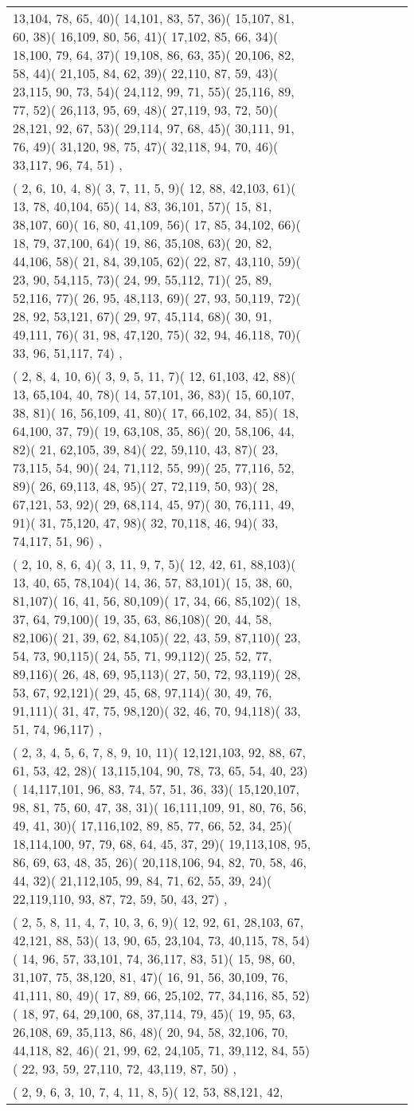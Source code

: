 \documentclass[border=10]{standalone}
\begin{document}
\begin{tabular}{@{}l@{}l@{}l@{}l@{}l@{}l@{}l@{}l@{}}
13,104, 78, 65, 40)( 14,101, 83, 57, 36)( 15,107, 81, 60, 38)( 16,109, 80, 56, 41)( 17,102, 85, 66, 34)( 18,100, 79, 64, 37)( 19,108, 86, 63, 35)( 20,106, 82, 58, 44)( 21,105, 84, 62, 39)( 22,110, 87, 59, 43)( 23,115, 90, 73, 54)( 24,112, 99, 71, 55)( 25,116, 89, 77, 52)( 26,113, 95, 69, 48)( 27,119, 93, 72, 50)( 28,121, 92, 67, 53)( 29,114, 97, 68, 45)( 30,111, 91, 76, 49)( 31,120, 98, 75, 47)( 32,118, 94, 70, 46)( 33,117, 96, 74, 51) ,\\  (  2,  6, 10,  4,  8)(  3,  7, 11,  5,  9)( 12, 88, 42,103, 61)( 13, 78, 40,104, 65)( 14, 83, 36,101, 57)( 15, 81, 38,107, 60)( 16, 80, 41,109, 56)( 17, 85, 34,102, 66)( 18, 79, 37,100, 64)( 19, 86, 35,108, 63)( 20, 82, 44,106, 58)( 21, 84, 39,105, 62)( 22, 87, 43,110, 59)( 23, 90, 54,115, 73)( 24, 99, 55,112, 71)( 25, 89, 52,116, 77)( 26, 95, 48,113, 69)( 27, 93, 50,119, 72)( 28, 92, 53,121, 67)( 29, 97, 45,114, 68)( 30, 91, 49,111, 76)( 31, 98, 47,120, 75)( 32, 94, 46,118, 70)( 33, 96, 51,117, 74) ,\\  (  2,  8,  4, 10,  6)(  3,  9,  5, 11,  7)( 12, 61,103, 42, 88)( 13, 65,104, 40, 78)( 14, 57,101, 36, 83)( 15, 60,107, 38, 81)( 16, 56,109, 41, 80)( 17, 66,102, 34, 85)( 18, 64,100, 37, 79)( 19, 63,108, 35, 86)( 20, 58,106, 44, 82)( 21, 62,105, 39, 84)( 22, 59,110, 43, 87)( 23, 73,115, 54, 90)( 24, 71,112, 55, 99)( 25, 77,116, 52, 89)( 26, 69,113, 48, 95)( 27, 72,119, 50, 93)( 28, 67,121, 53, 92)( 29, 68,114, 45, 97)( 30, 76,111, 49, 91)( 31, 75,120, 47, 98)( 32, 70,118, 46, 94)( 33, 74,117, 51, 96) ,\\  (  2, 10,  8,  6,  4)(  3, 11,  9,  7,  5)( 12, 42, 61, 88,103)( 13, 40, 65, 78,104)( 14, 36, 57, 83,101)( 15, 38, 60, 81,107)( 16, 41, 56, 80,109)( 17, 34, 66, 85,102)( 18, 37, 64, 79,100)( 19, 35, 63, 86,108)( 20, 44, 58, 82,106)( 21, 39, 62, 84,105)( 22, 43, 59, 87,110)( 23, 54, 73, 90,115)( 24, 55, 71, 99,112)( 25, 52, 77, 89,116)( 26, 48, 69, 95,113)( 27, 50, 72, 93,119)( 28, 53, 67, 92,121)( 29, 45, 68, 97,114)( 30, 49, 76, 91,111)( 31, 47, 75, 98,120)( 32, 46, 70, 94,118)( 33, 51, 74, 96,117) ,\\  (  2,  3,  4,  5,  6,  7,  8,  9, 10, 11)( 12,121,103, 92, 88, 67, 61, 53, 42, 28)( 13,115,104, 90, 78, 73, 65, 54, 40, 23)( 14,117,101, 96, 83, 74, 57, 51, 36, 33)( 15,120,107, 98, 81, 75, 60, 47, 38, 31)( 16,111,109, 91, 80, 76, 56, 49, 41, 30)( 17,116,102, 89, 85, 77, 66, 52, 34, 25)( 18,114,100, 97, 79, 68, 64, 45, 37, 29)( 19,113,108, 95, 86, 69, 63, 48, 35, 26)( 20,118,106, 94, 82, 70, 58, 46, 44, 32)( 21,112,105, 99, 84, 71, 62, 55, 39, 24)( 22,119,110, 93, 87, 72, 59, 50, 43, 27) ,\\  (  2,  5,  8, 11,  4,  7, 10,  3,  6,  9)( 12, 92, 61, 28,103, 67, 42,121, 88, 53)( 13, 90, 65, 23,104, 73, 40,115, 78, 54)( 14, 96, 57, 33,101, 74, 36,117, 83, 51)( 15, 98, 60, 31,107, 75, 38,120, 81, 47)( 16, 91, 56, 30,109, 76, 41,111, 80, 49)( 17, 89, 66, 25,102, 77, 34,116, 85, 52)( 18, 97, 64, 29,100, 68, 37,114, 79, 45)( 19, 95, 63, 26,108, 69, 35,113, 86, 48)( 20, 94, 58, 32,106, 70, 44,118, 82, 46)( 21, 99, 62, 24,105, 71, 39,112, 84, 55)( 22, 93, 59, 27,110, 72, 43,119, 87, 50) ,\\  (  2,  9,  6,  3, 10,  7,  4, 11,  8,  5)( 12, 53, 88,121, 42, 
\end{tabular}
\end{document}
